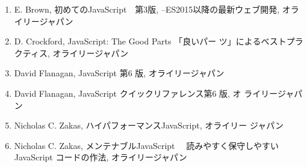 \begin{enumerate}
 \item E. Brown, 初めてのJavaScript　第3版, --ES2015以降の最新ウェブ開発, オラ
       イリージャパン\label{ES2016}
 \item D. Crockford, JavaScript: The Good Parts 「良いパー
	 ツ」によるベストプラ クティス, オライリージャパン\label{goodparats}
 \item David Flanagan, JavaScript 第6 版, オライリージャパン\label{JS6}
 \item David Flanagan, JavaScript クイックリファレンス第6 版, オ\label{JS6ref}
	 ライリージャパン
 \item Nicholas C. Zakas, ハイパフォーマンスJavaScript, オライリー
	 ジャパン\label{JSPerformance}
 \item Nicholas C. Zakas, メンテナブルJavaScript 　読みやすく保守しやすいJavaScript 
コードの作法, オライリージャパン
\end{enumerate}
